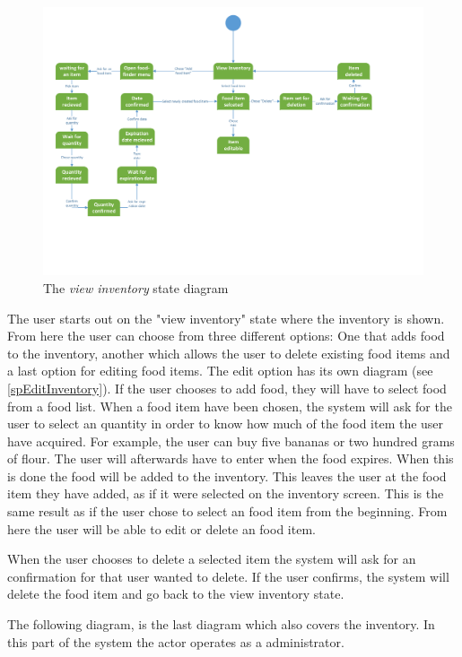 \begin{figure}[H]
	\centering
	\includegraphics[width=1.0\textwidth]{ApplicationDomain/spViewInventory.pdf} 
	\caption{The \textit{view inventory} state diagram}
	\label{Inventory_Figure}
\end{figure}
The user starts out on the "view inventory" state where the inventory is shown. From here the user can choose from three different options: One that adds food to the inventory, another which allows the user to delete existing food items and a last option for editing food items. The edit option has its own diagram (see \cref{spEditInventory}). If the user chooses to add food, they will have to select food from a food list. When a food item have been chosen, the system will ask for the user to select an quantity in order to know how much of the food item the user have acquired. For example, the user can buy five bananas or two hundred grams of flour. The user will afterwards have to enter when the food expires. When this is done the food will be added to the inventory. This leaves the user at the food item they have added, as if it were selected on the inventory screen. This is the same result as if the user chose to select an food item from the beginning. From here the user will be able to edit or delete an food item. \label{InvDesc}

When the user chooses to delete a selected item the system will ask for an confirmation for that user wanted to delete. If the user confirms, the system will delete the food item and go back to the view inventory state.


The following diagram, is the last diagram which also covers the inventory. In this part of the system the actor operates as a administrator.

